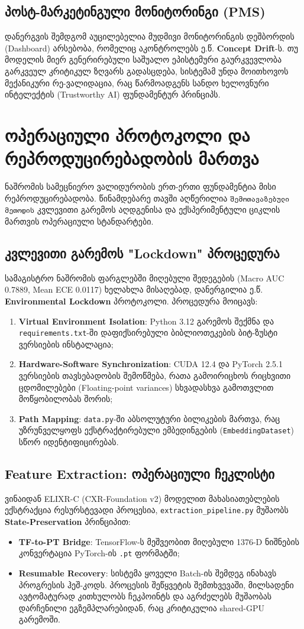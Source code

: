 \documentclass[12pt,a4paper,oneside]{report}
\begin{document}
\section{პოსტ-მარკეტინგული მონიტორინგი (PMS)}
დანერგვის შემდგომ აუცილებელია მუდმივი მონიტორინგის დეშბორდის (Dashboard) არსებობა, რომელიც აკონტროლებს ე.წ. \textbf{Concept Drift}-ს. თუ მოდელის მიერ გენერირებული საშუალო ეპისტემური გაურკვევლობა გარკვეულ კრიტიკულ ზღვარს გადასცდება, სისტემამ უნდა მოითხოვოს მექანიკური რე-ვალიდაცია, რაც წარმოადგენს სანდო ხელოვნური ინტელექტის (Trustworthy AI) ფუნდამენტურ პრინციპს.

\chapter{ოპერაციული პროტოკოლი და რეპროდუცირებადობის მართვა}

ნაშრომის სამეცნიერო ვალიდურობის ერთ-ერთი ფუნდამენტია მისი რეპროდუცირებადობა. წინამდებარე თავში აღწერილია \texttt{შემოთავაზებული მეთოდის} კვლევითი გარემოს აღდგენისა და ექსპერიმენტული ციკლის მართვის ოპერაციული სტანდარტები.

\section{კვლევითი გარემოს "Lockdown" პროცედურა}
სამაგისტრო ნაშრომის ფარგლებში მიღებული შედეგების (Macro AUC 0.7889, Mean ECE 0.0117) ხელახლა მისაღებად, დანერგილია ე.წ. \textbf{Environmental Lockdown} პროტოკოლი. პროცედურა მოიცავს:
\begin{enumerate}[leftmargin=1.6em]
    \item \textbf{Virtual Environment Isolation}: Python 3.12 გარემოს შექმნა და \texttt{requirements.txt}-ში დაფიქსირებული ბიბლიოთეკების ბიტ-ზუსტი ვერსიების ინსტალაცია;
    \item \textbf{Hardware-Software Synchronization}: CUDA 12.4 და PyTorch 2.5.1 ვერსიების თავსებადობის შემოწმება, რათა გამოირიცხოს რიცხვითი ცდომილებები (Floating-point variances) სხვადასხვა გამოთვლით მოწყობილობას შორის;
    \item \textbf{Path Mapping}: \texttt{data.py}-ში აბსოლუტური ბილიკების მართვა, რაც უზრუნველყოფს ექსტრაქტირებული ემბედინგების (\texttt{EmbeddingDataset}) სწორ იდენტიფიცირებას.
\end{enumerate}

\section{Feature Extraction: ოპერაციული ჩეკლისტი}
ვინაიდან ELIXR-C (CXR-Foundation v2) მოდელით მახასიათებლების ექსტრაქცია რესურსტევადი პროცესია, \texttt{extraction\_pipeline.py} მუშაობს \textbf{State-Preservation} პრინციპით:
\begin{itemize}
    \item \textbf{TF-to-PT Bridge}: TensorFlow-ს მეშვეობით მიღებული 1376-D ნიშნების კონვერტაცია PyTorch-ის \texttt{.pt} ფორმატში;
    \item \textbf{Resumable Recovery}: სისტემა ყოველი Batch-ის შემდეგ ინახავს პროგრესის ჰეშ-კოდს. პროცესის შეწყვეტის შემთხვევაში, მილსადენი ავტომატურად კითხულობს ჩეკპოინტს და აგრძელებს მუშაობას დარჩენილი ეგზემპლარებიდან, რაც კრიტიკულია shared-GPU გარემოში.
\end{itemize}
\end{document}
